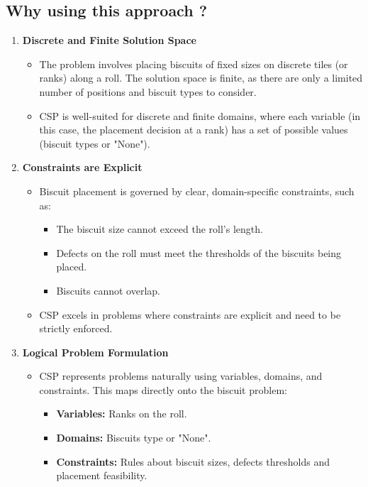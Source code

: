 \documentclass{modeleRapport}
\begin{document}
\subsection{Why using this approach ?}


\begin{enumerate}
    \item \textbf{Discrete and Finite Solution Space}
    \begin{itemize}
        \item The problem involves placing biscuits of fixed sizes on discrete tiles (or ranks) along a roll. 
        The solution space is finite, as there are only a limited number of positions and biscuit types to consider.
        \item CSP is well-suited for discrete and finite domains, where each variable (in this case, the placement 
        decision at a rank) has a set of possible values (biscuit types or "None").
    \end{itemize}

    \item \textbf{Constraints are Explicit}
    \begin{itemize}
        \item Biscuit placement is governed by clear, domain-specific constraints, such as:
        \begin{itemize}
            \item The biscuit size cannot exceed the roll's length.
            \item Defects on the roll must meet the thresholds of the biscuits being placed.
            \item Biscuits cannot overlap.
        \end{itemize}
        \item CSP excels in problems where constraints are explicit and need to be strictly enforced.
    \end{itemize}

    \item \textbf{Logical Problem Formulation}
    \begin{itemize}
        \item CSP represents problems naturally using variables, domains, and constraints. This maps directly onto 
        the biscuit problem:
        \begin{itemize}
            \item \textbf{Variables:} Ranks on the roll.
            \item \textbf{Domains:} Biscuits type or "None".
            \item \textbf{Constraints:} Rules about biscuit sizes, defects thresholds and placement feasibility.
        \end{itemize}
    \end{itemize}
\end{enumerate}
\end{document}
